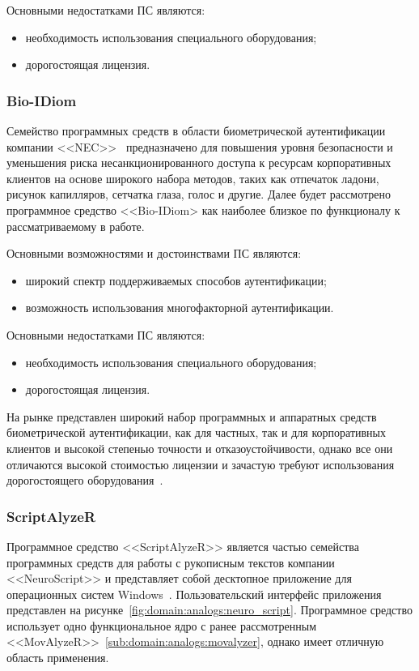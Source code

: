 Основными недостатками ПС являются:
\begin{itemize}
  \item необходимость использования специального оборудования;
  \item дорогостоящая лицензия.
\end{itemize}

\subsubsection{Bio-IDiom}
\label{sub:domain:analogs:nec}
Семейство программных средств в области биометрической аутентификации компании <<NEC>>~\cite{analogs_nec} предназначено для повышения уровня безопасности и уменьшения риска несанкционированного доступа к ресурсам корпоративных клиентов на основе широкого набора методов, таких как отпечаток ладони, рисунок капилляров, сетчатка глаза, голос и другие. Далее будет рассмотрено программное средство <<Bio-IDiom> как наиболее близкое по функционалу к рассматриваемому в работе.

Основными возможностями и достоинствами ПС являются:
\begin{itemize}
  \item широкий спектр поддерживаемых способов аутентификации;
  \item возможность использования многофакторной аутентификации.
\end{itemize}

Основными недостатками ПС являются:
\begin{itemize}
  \item необходимость использования специального оборудования;
  \item дорогостоящая лицензия.
\end{itemize}

На рынке представлен широкий набор программных и аппаратных средств биометрической аутентификации, как для частных, так и для корпоративных клиентов и высокой степенью точности и отказоустойчивости, однако все они отличаются высокой стоимостью лицензии и зачастую требуют использования дорогостоящего оборудования~\cite{wacom_lcd}.

\subsubsection{ScriptAlyzeR}
\label{sub:domain:analogs:neuro_script}
Программное средство <<ScriptAlyzeR>> является частью семейства программных средств для работы с рукописным текстов компании <<NeuroScript>> и представляет собой десктопное приложение для операционных систем Windows~\cite{analogs_scriptAlyzer}. Пользовательский интерфейс приложения представлен на рисунке~\ref{fig:domain:analogs:neuro_script}. Программное средство использует одно функциональное ядро с ранее рассмотренным <<MovAlyzeR>>~\ref{sub:domain:analogs:movalyzer}, однако имеет отличную область применения.

